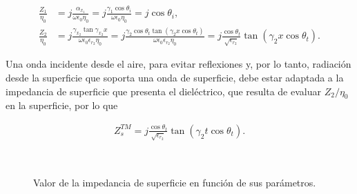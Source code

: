\begin{align}
	\frac{Z_{1}}{\eta_0} &= j\frac{\alpha_{x_1}}{\omega \epsilon_0 \eta_0} = j\frac{\gamma_1 \cos\theta_i}{\omega \epsilon_0 \eta_0} = j\cos \theta_i, \\
	\frac{Z_{2}}{\eta_0} &= j\frac{\gamma_{x_2} \tan \gamma_{x_2} x}{\omega \epsilon_0 \epsilon_{r_2} \eta_0} = j\frac{\gamma_2 \cos\theta_t \tan(\gamma_2 x \cos\theta_t)}{\omega \epsilon_0 \epsilon_{r_2} \eta_0} = j \frac{\cos \theta_t}{\sqrt{\epsilon_{r_2}}}\tan(\gamma_2 x \cos\theta_t).
\end{align}

Una onda incidente desde el aire, para evitar reflexiones y, por lo tanto, radiación desde la superficie que soporta una onda de superficie, debe estar adaptada a la impedancia de superficie que presenta el dieléctrico, que resulta de evaluar $Z_2/\eta_0$ en la superficie, por lo que

\begin{align}
	\label{eq:impedancia-superficie-tm-teorica}
	Z_s^{TM} = j \frac{\cos \theta_t}{\sqrt{\epsilon_{r_2}}}\tan(\gamma_2 t \cos\theta_t).
\end{align}


\begin{figure} [H]
	\centering 
	\hspace{5mm}
	\\
	
	\caption{Valor de la impedancia de superficie en función de sus parámetros.}
	\label{fig:Zstm-parametros}
\end{figure}


